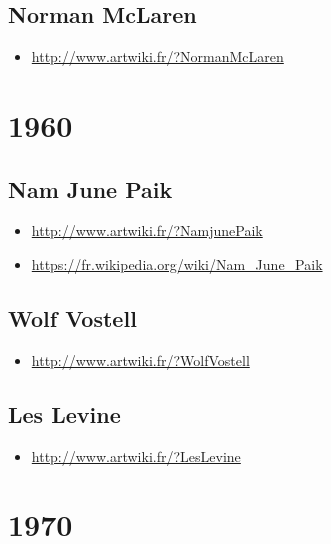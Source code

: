 \documentclass[
]{book}
\providecommand{\tightlist}{%
  \setlength{\itemsep}{0pt}\setlength{\parskip}{0pt}}
\begin{document}
\hypertarget{norman-mclaren}{%
\subsection{Norman McLaren}\label{norman-mclaren}}

\begin{itemize}
\tightlist
\item
  \url{http://www.artwiki.fr/?NormanMcLaren}
\end{itemize}

\hypertarget{section}{%
\section{1960}\label{section}}

\hypertarget{nam-june-paik}{%
\subsection{Nam June Paik}\label{nam-june-paik}}

\begin{itemize}
\tightlist
\item
  \url{http://www.artwiki.fr/?NamjunePaik}
\item
  \url{https://fr.wikipedia.org/wiki/Nam_June_Paik}
\end{itemize}

\hypertarget{wolf-vostell}{%
\subsection{Wolf Vostell}\label{wolf-vostell}}

\begin{itemize}
\tightlist
\item
  \url{http://www.artwiki.fr/?WolfVostell}
\end{itemize}

\hypertarget{les-levine}{%
\subsection{Les Levine}\label{les-levine}}

\begin{itemize}
\tightlist
\item
  \url{http://www.artwiki.fr/?LesLevine}
\end{itemize}

\hypertarget{section-1}{%
\section{1970}\label{section-1}}
\end{document}
